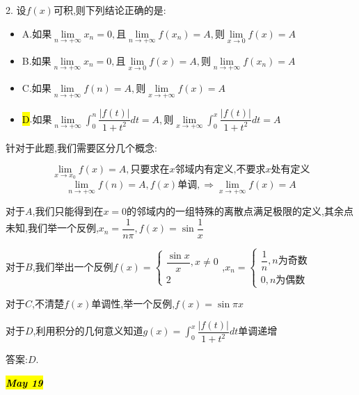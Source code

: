 2. 设$f(x)$可积,则下列结论正确的是: 
\begin{itemize}
	\item A.$\text{如果}\lim\limits_{n\rightarrow +\infty}x_{n}=0,\text{且}\lim\limits_{n\rightarrow +\infty}f(x_{n})=A,\text{则}\lim\limits_{x\rightarrow 0}f(x)=A$
	\item B.$\text{如果}\lim\limits_{n\rightarrow +\infty}x_{n}=0,\text{且}\lim\limits_{x\rightarrow 0}f(x)=A,\text{则}\lim\limits_{n\rightarrow +\infty}f(x_{n})=A$
	\item C.$\text{如果}\lim\limits_{n\rightarrow +\infty}f(n)=A,\text{则}\lim\limits_{x\rightarrow +\infty}f(x)=A$
	\item \hl{D}.$\text{如果}\lim\limits_{n\rightarrow +\infty}\int_{0}^{n}\dfrac{|f(t)|}{1+t^2}dt=A,\text{则}\lim\limits_{x\rightarrow +\infty}\int_{0}^{x}\dfrac{|f(t)|}{1+t^2}dt=A$
\end{itemize}
\begin{solution}
	
	针对于此题,我们需要区分几个概念: 
	
	$$\lim\limits_{x\rightarrow x_{0}}f(x)=A, \text{只要求在}x\text{邻域内有定义,不要求}x\text{处有定义}$$
	$$\lim\limits_{n\rightarrow+\infty}f(n)=A,f(x)\text{单调},\Rightarrow \lim\limits_{x\rightarrow+\infty}f(x)=A$$
	
	对于$A$,我们只能得到在$x=0$的邻域内的一组特殊的离散点满足极限的定义,其余点未知,我们举一个反例,$x_{n}=\dfrac{1}{n\pi},f(x)=\sin\dfrac{1}{x}$
	
	对于$B$,我们举出一个反例$f(x)=\left\lbrace 
	\begin{array}{l}
		\dfrac{\sin x}{x},x\neq 0\\
		2
	\end{array}
	\right. $,$x_{n}=\left\lbrace 
	\begin{array}{l}
		\dfrac{1}{n},n\text{为奇数}\\
		0,n\text{为偶数}
	\end{array}
	\right. $
	
	对于$C$,不清楚$f(x)$单调性,举一个反例,$f(x)=\sin \pi x$
	
	对于$D$,利用积分的几何意义知道$g(x)=\int_{0}^{x}\dfrac{|f(t)|}{1+t^2}dt$单调递增
	
	答案:$D$.
\end{solution}

\hl{\textbf{\textit{May 19}}}

